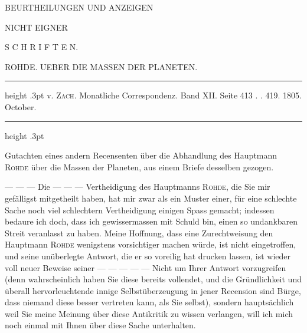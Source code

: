 \clearpage
\thispagestyle{empty}
\begin{center}
\vspace*{.22\textheight}
{\Large BEURTHEILUNGEN UND ANZEIGEN\par}
\vspace{14mm}
NICHT EIGNER\par
\vspace{14mm}
{\Large S C H R I F T E N.\par}
\end{center}
\clearpage
\thispagestyle{empty}
\noindent{}\null\par
\clearpage
\thispagestyle{empty}
\begin{center}
{\large ROHDE. UEBER DIE MASSEN DER PLANETEN.\par}
\end{center}
\begin{center}
\parbox{.84\linewidth}{%
\centering\small
\hrule height .3pt\relax\vspace{2.5pt}
v. \textsc{Zach}. Monatliche Correspondenz. Band XII. Seite 413 . . 419. 1805. October.\par
\vspace{2.5pt}\hrule height .3pt\relax
}
\end{center}
\begin{center}Gutachten eines andern Recensenten über die Abhandlung des Hauptmann \textsc{Rohde} über die Massen der Planeten, aus einem Briefe desselben gezogen.\end{center}

\noindent --- --- --- Die --- --- --- Vertheidigung des Hauptmanns \textsc{Rohde}, die Sie mir gefälligst mitgetheilt haben, hat mir zwar als ein Muster einer, für eine schlechte Sache noch viel schlechtern Vertheidigung einigen Spass gemacht; indessen bedaure ich doch, dass ich gewissermassen mit Schuld bin, einen so undankbaren Streit veranlasst zu haben. Meine Hoffnung, dass eine Zurechtweisung den Hauptmann \textsc{Rohde} wenigstens vorsichtiger machen würde, ist nicht eingetroffen, und seine unüberlegte Antwort, die er so voreilig hat drucken lassen, ist wieder voll neuer Beweise seiner --- --- --- --- --- Nicht um Ihrer Antwort vorzugreifen (denn wahrscheinlich haben Sie diese bereits vollendet, und die Gründlichkeit und überall hervorleuchtende innige Selbstüberzeugung in jener Recension sind Bürge, dass niemand diese besser vertreten kann, als Sie selbst), sondern hauptsächlich weil Sie meine Meinung über diese Antikritik zu wissen verlangen, will ich mich noch einmal mit Ihnen über diese Sache unterhalten.

